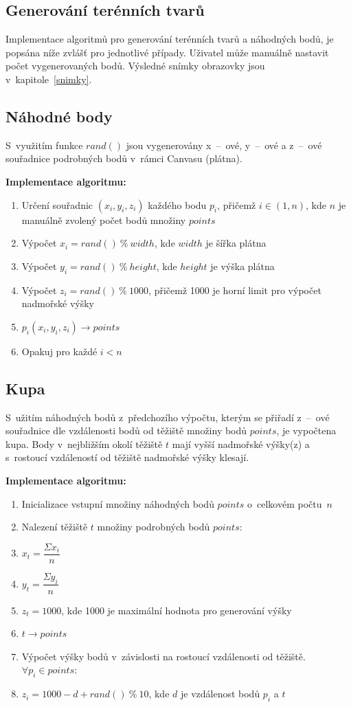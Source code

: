 \documentclass[a4paper, 12pt, oneside, titlepage]{article} %
\begin{document}
\subsection{Generování terénních tvarů}\label{gen_ter_tvar}
Implementace algoritmů pro generování terénních tvarů a náhodných bodů, je popsána níže zvlášť pro jednotlivé případy. Uživatel může manuálně nastavit počet vygenerovaných bodů. Výsledné snímky obrazovky jsou v~kapitole~\ref{snimky}.

\subsection{Náhodné body}
S~využitím funkce $rand()$ jsou vygenerovány x~--~ové, y~--~ové a z~--~ové souřadnice podrobných bodů v~rámci Canvasu (plátna).

\textbf{Implementace algoritmu:}
\begin{enumerate}
\item Určení souřadnic $(x_i,y_i,z_i)$ každého bodu $p_i$, přičemž $i \in (1,n)$, kde $n$ je manuálně zvolený počet bodů množiny $points$
\item \quad Výpočet $x_i=rand()~\%~width$, kde $width$ je šířka plátna
\item \quad Výpočet $y_i=rand()~\%~height$, kde $height$ je výška plátna
\item \quad Výpočet $z_i=rand()~\%~1000$, přičemž 1000 je horní limit pro výpočet nadmořské výšky
\item \quad $p_i(x_i,y_i,z_i) \rightarrow points$
\item Opakuj pro každé $i<n$
\end{enumerate}

\subsection{Kupa}\label{kupa}
S~užitím náhodných bodů z~předchozího výpočtu, kterým se přiřadí z~--~ové souřadnice dle vzdálenosti bodů od těžiště množiny bodů $points$, je vypočtena kupa. Body v~nejbližším okolí těžiště $t$ mají vyšší nadmořské výšky(z) a s~rostoucí vzdáleností od těžiště nadmořské výšky klesají.

\textbf{Implementace algoritmu:}
\begin{enumerate}
\item Inicializace vstupní množiny náhodných bodů $points$ o~celkovém počtu~$n$
\item Nalezení těžiště $t$ množiny podrobných bodů $points$:
\item \quad $x_t= \dfrac{\Sigma x_i}{n}$ 
\item \quad $y_t= \dfrac{\Sigma y_i}{n}$
\item \quad $z_t= 1000$, kde 1000 je maximální hodnota pro generování výšky
\item $t \rightarrow points$
\item Výpočet výšky bodů v~závislosti na rostoucí vzdálenosti od těžiště. $\forall p_i \in points$:
\item \quad $z_i=1000-d+rand()~\%~10$, kde $d$ je vzdálenost bodů $p_i$ a $t$
\end{enumerate}
\end{document}
